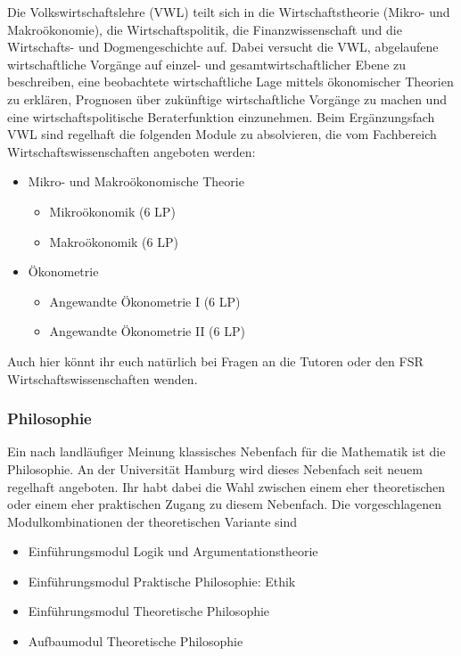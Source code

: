 Die Volkswirtschaftslehre (VWL) teilt sich in die Wirtschaftstheorie (Mikro-
und Makroökonomie), die Wirtschaftspolitik, die Finanzwissenschaft und die
Wirtschafts- und Dogmengeschichte auf. Dabei versucht die VWL, abgelaufene
wirtschaftliche Vorgänge auf einzel- und gesamtwirtschaftlicher Ebene zu
beschreiben, eine beobachtete wirtschaftliche Lage mittels ökonomischer
Theorien zu erklären, Prognosen über zukünftige wirtschaftliche Vorgänge zu
machen und eine wirtschaftspolitische Beraterfunktion einzunehmen.  Beim
Ergänzungsfach VWL sind regelhaft die folgenden Module zu absolvieren, die vom
Fachbereich Wirtschaftswissenschaften angeboten werden:

\begin{itemize}\itemsep 0pt
    \item Mikro- und Makroökonomische Theorie
        \begin{itemize}\itemsep 0pt
              \item Mikroökonomik (6 LP)
              \item Makroökonomik (6 LP)
        \end{itemize}
    \item Ökonometrie
          \begin{itemize}\itemsep 0pt
              \item Angewandte Ökonometrie I (6 LP)
              \item Angewandte Ökonometrie II (6 LP)
          \end{itemize}
\end{itemize}

Auch hier könnt ihr euch natürlich bei Fragen an die Tutoren oder den FSR
Wirtschaftswissenschaften wenden.

\subsubsection{Philosophie}

Ein nach landläufiger Meinung klassisches Nebenfach für die Mathematik ist die
Philosophie. An der Universität Hamburg wird dieses Nebenfach seit neuem
regelhaft angeboten. Ihr habt dabei die Wahl zwischen einem eher theoretischen
oder einem eher praktischen Zugang zu diesem Nebenfach. Die vorgeschlagenen
Modulkombinationen der theoretischen Variante sind

\begin{itemize}\itemsep 0pt
    \item Einführungsmodul Logik und Argumentationstheorie 
    \item Einführungsmodul Praktische Philosophie: Ethik 
    \item Einführungsmodul Theoretische Philosophie 
    \item Aufbaumodul Theoretische Philosophie 
\end{itemize}

